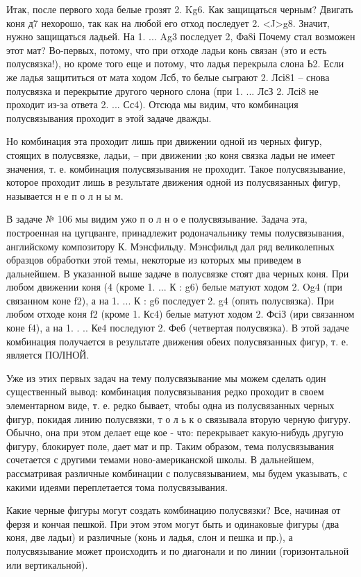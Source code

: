 Итак, после первого хода белые грозят 2. Kg6. Как защищаться черным? Двигать коня д7 нехорошо, так как на любой его отход последует 2. <J>g8. Значит, нужно защищаться ладьей. На 1. ... Ag3 последует 2, Фа8і Почему стал возможен этот мат? Во-первых, потому, что при отходе ладьи конь связан (это и есть полусвязка!), но кроме того еще и потому, что ладья перекрыла слона Ь2. Если же ладья защититься от мата ходом Лсб, то белые сыграют 2. Лсі81 -- снова полусвязка и перекрытие другого черного слона (при 1. ... ЛсЗ 2. Лсі8 не проходит из-за ответа 2. ... Сс4). Отсюда мы видим, что комбинация полусвязывания проходит в этой задаче дважды.

Но комбинация эта проходит лишь при движении одной из черных фигур, стоящих в полусвязке, ладьи, -- при движении ;ко коня связка ладьи не имеет значения, т. е. комбинация полусвязывания не проходит. Такое полусвязывание, которое проходит лишь в результате движения одной из полусвязанных фигур, называется н е п о л н ы м.

В задаче № 106 мы видим ужо п о л н о е полусвязывание. Задача эта, построенная на цугцванге, принадлежит родоначальнику темы полусвязывания, английскому композитору К. Мэнсфильду. Мэнсфильд дал ряд великолепных образцов обработки этой темы, некоторые из которых мы приведем в дальнейшем. В указанной выше задаче в полусвязке стоят два черных коня. При любом движении коня (4 (кроме 1. ... К : g6) белые матуют ходом 2. Og4 (при связанном коне f2), а на 1. ... К : g6 последует 2. g4 (опять полусвязка). При любом отходе коня f2 (кроме 1. Кс4) белые матуют ходом 2. ФсіЗ (ири связанном коне f4), а на 1. . .. Ке4 последуют 2. Феб (четвертая полусвязка). В этой задаче комбинация получается в результате движения обеих полусвязанных фигур, т. е. является ПОЛНОЙ.

Уже из этих первых задач на тему полусвязывание мы можем сделать один существенный вывод: комбинация полусвязывания редко проходит в своем элементарном виде, т. е. редко бывает, чтобы одна из полусвязанных черных фигур, покидая линию полусвязки, т о л ь к о связывала вторую черную фигуру. Обычно, она при этом делает еще кое - что: перекрывает какую-нибудь другую фигуру, блокирует поле, дает мат и пр. Таким образом, тема полусвязывания сочетается с другими темами ново-американской школы. В дальнейшем, рассматривая различные комбинации с полусвязыванием, мы будем указывать, с какими идеями переплетается тома полусвязывания.

Какие черные фигуры могут создать комбинацию полусвязки? Все, начиная от ферзя и кончая пешкой. При этом этом могут быть и одинаковые фигуры (два коня, две ладьи) и различные (конь и ладья, слон и пешка и пр.), а полусвязывание может происходить и по диагонали и по линии (горизонтальной или вертикальной).

